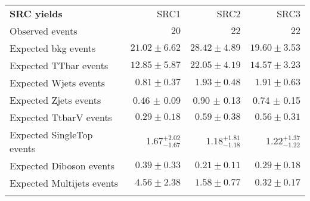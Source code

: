 

\begin{table}[!h]
\begin{center}
\setlength{\tabcolsep}{0.0pc}
{\small
\begin{tabular*}{\textwidth}{@{\extracolsep{\fill}}lrrr}
\noalign{\smallskip}\hline\noalign{\smallskip}
{\bf SRC yields}           & SRC1            & SRC2            & SRC3              \\[-0.05cm]
\noalign{\smallskip}\hline\noalign{\smallskip}
Observed events          & $20$              & $22$              & $22$                    \\
\noalign{\smallskip}\hline\noalign{\smallskip}
Expected bkg events         & $21.02 \pm 6.62$          & $28.42 \pm 4.89$          & $19.60 \pm 3.53$              \\
\noalign{\smallskip}\hline\noalign{\smallskip}
        Expected TTbar events         & $12.85 \pm 5.87$          & $22.05 \pm 4.19$          & $14.57 \pm 3.23$              \\
        Expected Wjets events         & $0.81 \pm 0.37$          & $1.93 \pm 0.48$          & $1.91 \pm 0.63$              \\
        Expected Zjets events         & 0.46 $\pm$ 0.09          & 0.90 $\pm$ 0.13          &  0.74 $\pm$ 0.15               \\
        Expected TtbarV events         & $0.29 \pm 0.18$          & $0.59 \pm 0.38$          & $0.56 \pm 0.31$              \\
        Expected SingleTop events         & $1.67_{-1.67}^{+2.02}$          & $1.18_{-1.18}^{+1.81}$          & $1.22_{-1.22}^{+1.37}$              \\
        Expected Diboson events         & $0.39 \pm 0.33$          & $0.21 \pm 0.11$          & $0.29 \pm 0.18$              \\
        Expected Multijets events         & $4.56 \pm 2.38$          & $1.58 \pm 0.77$          & $0.32 \pm 0.17$              \\
 \noalign{\smallskip}\hline\noalign{\smallskip}

\end{tabular*}

}
\end{center}
\end{table}
